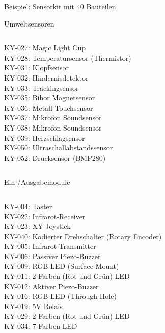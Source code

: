 {\begin{frame}[allowframebreaks]{Beispiel: Sensorkit mit 40 Bauteilen}
\begin{block}{Umweltsensoren}
\begin{columns}
            KY-027: Magic Light Cup  \\
            KY-028: Temperatursensor (Thermistor) \\
            KY-031: Klopfsensor \\
            KY-032: Hindernisdetektor \\
            KY-033: Trackingsensor \\
            KY-035: Bihor Magnetsensor \\
            KY-036: Metall-Touchsensor \\
            KY-037: Mikrofon Soundsensor \\
            KY-038: Mikrofon Soundsensor \\
            KY-039: Herzschlagsensor \\
            KY-050: Ultraschallabstandssensor \\
            KY-052: Drucksensor (BMP280) \\
        \end{columns}
    \end{block}

    \begin{block}{Ein-/Ausgabemodule}
        \medskip
        \begin{columns}
            KY-004: Taster \\
            KY-022: Infrarot-Receiver \\
            KY-023: XY-Joystick \\
            KY-040: Kodierter Drehschalter (Rotary Encoder) \\
            \smallskip
            KY-005: Infrarot-Transmitter \\
            KY-006: Passiver Piezo-Buzzer \\
            KY-009: RGB-LED (Surface-Mount) \\

            KY-011: 2-Farben (Rot und Grün) LED \\
            KY-012: Aktiver Piezo-Buzzer \\
            KY-016: RGB-LED (Through-Hole) \\
            KY-019: 5V Relais \\
            KY-029: 2-Farben (Rot und Grün) LED \\
            KY-034: 7-Farben LED \\
        \end{columns}
    \end{block}


\end{frame}}
